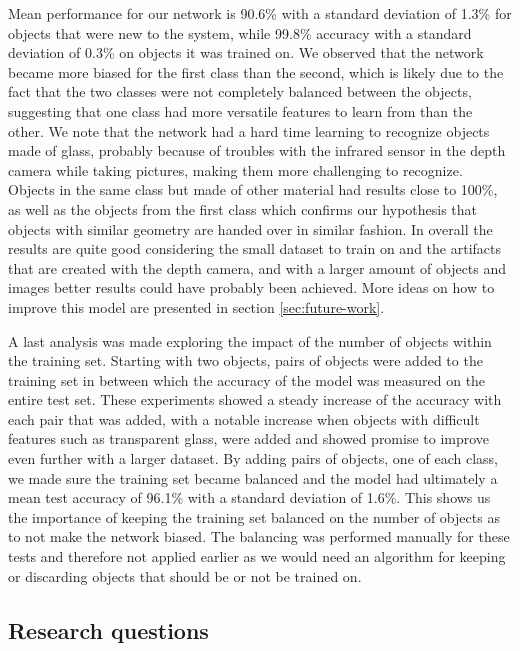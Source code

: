 Mean performance for our network is 90.6\% with a standard deviation of 1.3\% for objects that were new to the system, while 99.8\% accuracy with a standard deviation of 0.3\% on objects it was trained on. We observed that the network became more biased for the first class than the second, which is likely due to the fact that the two classes were not completely balanced between the objects, suggesting that one class had more versatile features to learn from than the other. We note that the network had a hard time learning to recognize objects made of glass, probably because of troubles with the infrared sensor in the depth camera while taking pictures, making them more challenging to recognize. Objects in the same class but made of other material had results close to 100\%, as well as the objects from the first class which confirms our hypothesis that objects with similar geometry are handed over in similar fashion. In overall the results are quite good considering the small dataset to train on and the artifacts that are created with the depth camera, and with a larger amount of objects and images better results could have probably been achieved. More ideas on how to improve this model are presented in section \ref{sec:future-work}.

A last analysis was made exploring the impact of the number of objects within the training set. Starting with two objects, pairs of objects were added to the training set in between which the accuracy of the model was measured on the entire test set. These experiments showed a steady increase of the accuracy with each pair that was added, with a notable increase when objects with difficult features such as transparent glass, were added and showed promise to improve even further with a larger dataset. By adding pairs of objects, one of each class, we made sure the training set became balanced and the model had ultimately a mean test accuracy of 96.1\% with a standard deviation of 1.6\%. This shows us the importance of keeping the training set balanced on the number of objects as to not make the network biased. The balancing was performed manually for these tests and therefore not applied earlier as we would need an algorithm for keeping or discarding objects that should be or not be trained on.



\subsection*{Research questions}

